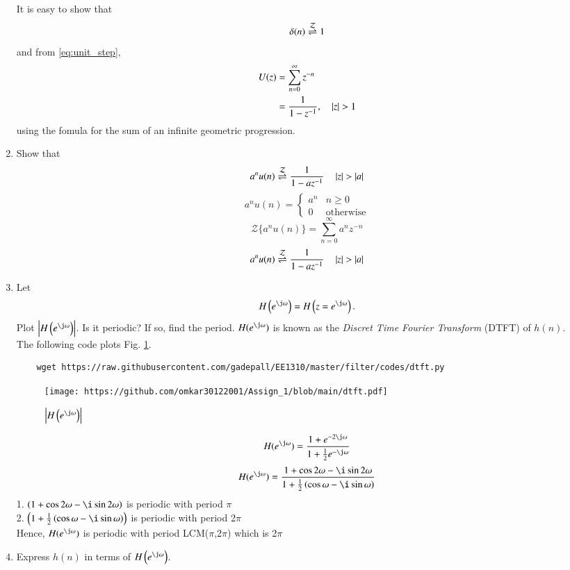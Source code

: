 \documentclass[journal,12pt,twocolumn]{IEEEtran}
\renewcommand\thesection{\arabic{section}}
\begin{document}
\begin{enumerate}[label=\thesection.\arabic*]
\solution It is easy to show that
\begin{equation}
	\delta(n) \overset{\mathcal{Z}}{ \rightleftharpoons} 1
\end{equation}
and from \eqref{eq:unit_step},
\begin{align}
	U(z) &= \sum _{n= 0}^{\infty}z^{-n}
	\\
	&=\frac{1}{1-z^{-1}}, \quad \left\vert z\right\vert > 1
\end{align}
using the fomula for the sum of an infinite geometric progression.
%
\item Show that 
\begin{equation}
	\label{eq:anun}
	a^nu(n) \overset{\mathcal{Z}}{ \rightleftharpoons} \frac{1}{1-az^{-1}} \quad \left\vert z\right\vert > \left\vert a\right\vert
\end{equation}
\solution
\begin{equation}
	\label{eq:unit_step}
	a^{n}u(n)
	=
	\begin{cases}
		a^{n} & n \ge 0
		\\
		0 & \text{otherwise}
	\end{cases}
\end{equation}
\begin{equation}
	{\mathcal{Z}}\{a^{n}u(n)\} = \sum_{n=0}^{\infty}a^{n}z^{-n}
\end{equation}
\begin{equation}
	a^{n}u(n) \overset{\mathcal{Z}}{ \rightleftharpoons} \frac{1}{1-az^{-1}} \quad \left\vert z\right\vert > \left\vert a\right\vert
\end{equation}
%
\item 
Let
\begin{equation}
	H\brak{e^{\j \omega}} = H\brak{z = e^{\j \omega}}.
\end{equation}
Plot $\abs{H\brak{e^{\j \omega}}}$.  Is it periodic? If so, find the period. $H(e^{\j \omega})$ is
known as the {\em Discret Time Fourier Transform} (DTFT) of $h(n)$.
\\
\solution The following code plots Fig. \ref{fig:dtft}.
\begin{lstlisting}
	wget https://raw.githubusercontent.com/gadepall/EE1310/master/filter/codes/dtft.py
\end{lstlisting}
\begin{figure}[!ht]
	\centering
	\texttt{[image: https://github.com/omkar30122001/Assign\_1/blob/main/dtft.pdf]}
	\caption{$\abs{H\brak{e^{\j\omega}}}$}
	\label{fig:dtft}
\end{figure}
\solution
\begin{equation}
	H(e^{\j\omega}) = \frac{1 + e^{-2\j\omega}}{1 + \frac{1}{2}e^{-\j\omega}}
\end{equation}
\begin{equation}
	H(e^{\j\omega}) = \frac{1 + \cos2\omega - \i\sin2\omega}{1 + \frac{1}{2}\brak{\cos\omega - \i\sin\omega}}
\end{equation}
1. $\brak{1 + \cos2\omega - \i\sin2\omega}$ is periodic with period $\pi$ \\
2. $\brak{1 + \frac{1}{2}\brak{\cos\omega - \i\sin\omega}}$ is periodic with period 2$\pi$ \\
Hence, $H(e^{\j\omega})$ is periodic with period LCM($\pi$,2$\pi$) which is 2$\pi$
\item Express $h(n)$ in terms of $H\brak{e^{\j \omega}}$.
\end{enumerate}
\end{document}

